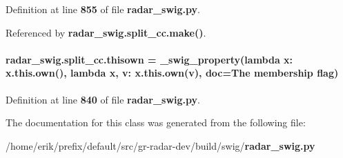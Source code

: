 Definition at line {\bf 855} of file {\bf radar\+\_\+swig.\+py}.



Referenced by {\bf radar\+\_\+swig.\+split\+\_\+cc.\+make()}.

\paragraph[{thisown}]{\setlength{\rightskip}{0pt plus 5cm}radar\+\_\+swig.\+split\+\_\+cc.\+thisown = {\bf \+\_\+swig\+\_\+property}(lambda x\+: x.\+this.\+own(), lambda {\bf x}, v\+: x.\+this.\+own(v), doc=\textquotesingle{}The membership flag\textquotesingle{})\hspace{0.3cm}{\ttfamily [static]}}\label{classradar__swig_1_1split__cc_a2b998d62a18209247347f5b07461e3ae}


Definition at line {\bf 840} of file {\bf radar\+\_\+swig.\+py}.



The documentation for this class was generated from the following file\+:\begin{DoxyCompactItemize}
\item 
/home/erik/prefix/default/src/gr-\/radar-\/dev/build/swig/{\bf radar\+\_\+swig.\+py}\end{DoxyCompactItemize}
